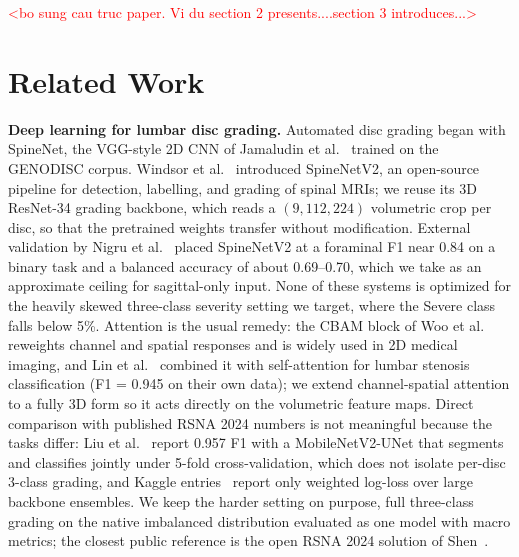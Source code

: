 \documentclass[runningheads]{llncs}
\begin{document}
\textcolor{red}{<bo sung cau truc paper. Vi du section 2 presents....section 3 introduces...>}

\section{Related Work}\label{sec2}

\textbf{Deep learning for lumbar disc grading.}
Automated disc grading began with SpineNet, the VGG-style 2D CNN of Jamaludin et al.~\cite{jamaludin2017} trained on the GENODISC corpus. Windsor et al.~\cite{windsor2022} introduced SpineNetV2, an open-source pipeline for detection, labelling, and grading of spinal MRIs; we reuse its 3D ResNet-34 grading backbone, which reads a $(9, 112, 224)$ volumetric crop per disc, so that the pretrained weights transfer without modification. External validation by Nigru et al.~\cite{nigru2024} placed SpineNetV2 at a foraminal F1 near 0.84 on a binary task and a balanced accuracy of about 0.69--0.70, which we take as an approximate ceiling for sagittal-only input. None of these systems is optimized for the heavily skewed three-class severity setting we target, where the Severe class falls below 5\%. Attention is the usual remedy: the CBAM block of Woo et al.~\cite{woo2018cbam} reweights channel and spatial responses and is widely used in 2D medical imaging, and Lin et al.~\cite{lin2024cbam} combined it with self-attention for lumbar stenosis classification (F1 = 0.945 on their own data); we extend channel-spatial attention to a fully 3D form so it acts directly on the volumetric feature maps. Direct comparison with published RSNA 2024 \cite{kaggle2024} numbers is not meaningful because the tasks differ: Liu et al.~\cite{aktan2025} report 0.957 F1 with a MobileNetV2-UNet that segments and classifies jointly under 5-fold cross-validation, which does not isolate per-disc 3-class grading, and Kaggle entries~\cite{kaggle2024} report only weighted log-loss over large backbone ensembles. We keep the harder setting on purpose, full three-class grading on the native imbalanced distribution evaluated as one model with macro metrics; the closest public reference is the open RSNA 2024 solution of Shen~\cite{nshen2024}.
\end{document}
